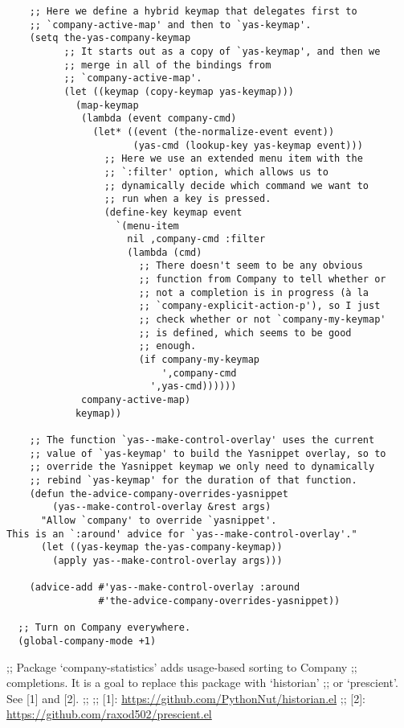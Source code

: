 \documentclass[11pt]{article}
\begin{document}
\begin{verbatim}
    ;; Here we define a hybrid keymap that delegates first to
    ;; `company-active-map' and then to `yas-keymap'.
    (setq the-yas-company-keymap
          ;; It starts out as a copy of `yas-keymap', and then we
          ;; merge in all of the bindings from
          ;; `company-active-map'.
          (let ((keymap (copy-keymap yas-keymap)))
            (map-keymap
             (lambda (event company-cmd)
               (let* ((event (the-normalize-event event))
                      (yas-cmd (lookup-key yas-keymap event)))
                 ;; Here we use an extended menu item with the
                 ;; `:filter' option, which allows us to
                 ;; dynamically decide which command we want to
                 ;; run when a key is pressed.
                 (define-key keymap event
                   `(menu-item
                     nil ,company-cmd :filter
                     (lambda (cmd)
                       ;; There doesn't seem to be any obvious
                       ;; function from Company to tell whether or
                       ;; not a completion is in progress (à la
                       ;; `company-explicit-action-p'), so I just
                       ;; check whether or not `company-my-keymap'
                       ;; is defined, which seems to be good
                       ;; enough.
                       (if company-my-keymap
                           ',company-cmd
                         ',yas-cmd))))))
             company-active-map)
            keymap))

    ;; The function `yas--make-control-overlay' uses the current
    ;; value of `yas-keymap' to build the Yasnippet overlay, so to
    ;; override the Yasnippet keymap we only need to dynamically
    ;; rebind `yas-keymap' for the duration of that function.
    (defun the-advice-company-overrides-yasnippet
        (yas--make-control-overlay &rest args)
      "Allow `company' to override `yasnippet'.
This is an `:around' advice for `yas--make-control-overlay'."
      (let ((yas-keymap the-yas-company-keymap))
        (apply yas--make-control-overlay args)))

    (advice-add #'yas--make-control-overlay :around
                #'the-advice-company-overrides-yasnippet))

  ;; Turn on Company everywhere.
  (global-company-mode +1)
\end{verbatim}

;; Package `company-statistics' adds usage-based sorting to Company
;; completions. It is a goal to replace this package with `historian'
;; or `prescient'. See [1] and [2].
;;
;; [1]: \url{https://github.com/PythonNut/historian.el}
;; [2]: \url{https://github.com/raxod502/prescient.el}
\end{document}
